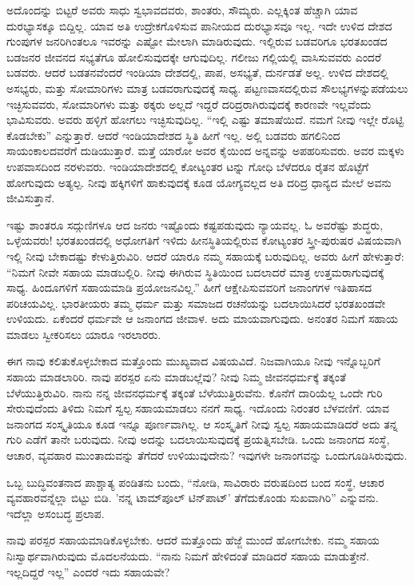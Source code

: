ಅದೊಂದನ್ನು ಬಿಟ್ಟರೆ ಅವರು ಸಾಧು ಸ್ವಭಾವದವರು, ಶಾಂತರು, ಸೌಮ್ಯರು. ಎಲ್ಲಕ್ಕಿಂತ ಹೆಚ್ಚಾಗಿ ಯಾವ ದುರಭ್ಯಾಸಕ್ಕೂ ಬಿದ್ದಿಲ್ಲ. ಯಾವ ಅತಿ ಉದ್ರೇಕಗೊಳಿಸುವ ಪಾನೀಯದ ದುರಭ್ಯಾಸವೂ ಇಲ್ಲ. ಇದೇ ಉಳಿದ ದೇಶದ ಗುಂಪುಗಳ ಜನರಿಗಿಂತಲೂ ಇವರನ್ನು ಎಷ್ಟೋ ಮೇಲಾಗಿ ಮಾಡಿರುವುದು. ಇಲ್ಲಿರುವ ಬಡವರಿಗೂ ಭರತಖಂಡದ ಬಡಜನರ ಜೀವನದ ಸಭ್ಯತೆಗೂ ಹೋಲಿಸುವುದಕ್ಕೇ ಆಗುವುದಿಲ್ಲ. ಗಲೀಜು ಗಲ್ಲಿಯಲ್ಲಿ ವಾಸಿಸುವವರು ಎಂದರೆ ಬಡವರು. ಆದರೆ ಬಡತನವೆಂದರೆ ಇಂಡಿಯಾ ದೇಶದಲ್ಲಿ, ಪಾಪ, ಅಸಭ್ಯತೆ, ದುರ್ನಡತೆ ಅಲ್ಲ. ಉಳಿದ ದೇಶದಲ್ಲಿ ಅಸಭ್ಯರು, ಮತ್ತು ಸೋಮಾರಿಗಳು ಮಾತ್ರ ಬಡವರಾಗುವುದಕ್ಕೆ ಸಾಧ್ಯ. ಪಟ್ಟಣವಾಸದಲ್ಲಿರುವ ಸೌಲಭ್ಯಗಳನ್ನು\break ಪಡೆಯಲು ಇಚ್ಛಿಸುವವರು, ಸೋಮಾರಿಗಳು ಮತ್ತು ಠಕ್ಕರು ಅಲ್ಲದೆ ಇದ್ದರೆ ದರಿದ್ರರಾಗಿರುವುದಕ್ಕೆ ಕಾರಣವೇ ಇಲ್ಲವೆಂದು ಭಾವಿಸುವರು. ಅವರು ಹಳ್ಳಿಗೆ ಹೋಗಲು ಇಚ್ಛಿಸುವುದಿಲ್ಲ. “ಇಲ್ಲಿ ಎಷ್ಟು ತಮಾಷೆಯಿದೆ. ನಮಗೆ ನೀವು ಇಲ್ಲೇ ರೊಟ್ಟಿ ಕೊಡಬೇಕು” ಎನ್ನುತ್ತಾರೆ. ಆದರೆ ಇಂಡಿಯಾದೇಶದ ಸ್ಥಿತಿ ಹೀಗೆ ಇಲ್ಲ. ಅಲ್ಲಿ ಬಡವರು ಹಗಲಿನಿಂದ ಸಾಯಂಕಾಲದವರೆಗೆ ದುಡಿಯುತ್ತಾರೆ. ಮತ್ತೆ ಯಾರೋ ಅವರ ಕೈಯಿಂದ ಅನ್ನವನ್ನು ಅಪಹರಿಸುವರು. ಅವರ ಮಕ್ಕಳು ಉಪವಾಸದಿಂದ ನರಳುವರು. ಇಂಡಿಯಾದೇಶದಲ್ಲಿ ಕೋಟ್ಯಂತರ ಟನ್ನು ಗೋಧಿ ಬೆಳೆದರೂ ರೈತನ ಹೊಟ್ಟೆಗೆ ಹೋಗುವುದು ಅತ್ಯಲ್ಪ. ನೀವು ಹಕ್ಕಿಗಳಿಗೆ ಹಾಕುವುದಕ್ಕೆ ಕೂಡ ಯೋಗ್ಯವಲ್ಲದ ಅತಿ ದರಿದ್ರ ಧಾನ್ಯದ ಮೇಲೆ ಅವನು ಜೀವಿಸುತ್ತಾನೆ.

ಇಷ್ಟು ಶಾಂತರೂ ಸದ್ಗುಣಿಗಳೂ ಆದ ಜನರು ಇಷ್ಟೊಂದು ಕಷ್ಟಪಡುವುದು ನ್ಯಾಯವಲ್ಲ. ಓ ಅವರೆಷ್ಟು ಶುದ್ಧರು, ಒಳ್ಳೆಯವರು! ಭರತಖಂಡದಲ್ಲಿ ಅಧೋಗತಿಗೆ ಇಳಿದು ಹೀನಸ್ಥಿತಿಯಲ್ಲಿರುವ ಕೋಟ್ಯಂತರ ಸ್ತ್ರೀ-ಪುರುಷರ ವಿಷಯವಾಗಿ ಇಲ್ಲಿ ನೀವು ಬೇಕಾದಷ್ಟು ಕೇಳುತ್ತಿರುವಿರಿ. ಆದರೆ ಯಾರೂ ನಮ್ಮ ಸಹಾಯಕ್ಕೆ ಬರುವುದಿಲ್ಲ. ಅವರು ಹೀಗೆ ಹೇಳುತ್ತಾರೆ: “ನಿಮಗೆ ನೀವೇ ಸಹಾಯ ಮಾಡಬಲ್ಲಿರಿ. ನೀವು ಈಗಿರುವ ಸ್ಥಿತಿಯಿಂದ ಬದಲಾದರೆ ಮಾತ್ರ ಉತ್ತಮರಾಗುವುದಕ್ಕೆ ಸಾಧ್ಯ. ಹಿಂದೂಗಳಿಗೆ ಸಹಾಯಮಾಡಿ ಪ್ರಯೋಜನವಿಲ್ಲ.” ಹೀಗೆ ಆಕ್ಷೇಪಿಸುವವರಿಗೆ ಜನಾಂಗಗಳ ಇತಿಹಾಸದ ಪರಿಚಯವಿಲ್ಲ. ಭಾರತೀಯರು ತಮ್ಮ ಧರ್ಮ ಮತ್ತು ಸಮಾಜದ ರಚನೆಯನ್ನು ಬದಲಾಯಿಸಿದರೆ ಭರತಖಂಡವೇ ಉಳಿಯದು. ಏಕೆಂದರೆ ಧರ್ಮವೇ ಆ ಜನಾಂಗದ ಜೀವಾಳ. ಅದು ಮಾಯವಾಗುವುದು. ಅನಂತರ ನಿಮಗೆ ಸಹಾಯ ಮಾಡಲು ಸ್ವೀಕರಿಸಲು ಯಾರೂ ಇರಲಾರರು.

ಈಗ ನಾವು ಕಲಿತುಕೊಳ್ಳಬೇಕಾದ ಮತ್ತೊಂದು ಮುಖ್ಯವಾದ ವಿಷಯವಿದೆ. ನಿಜವಾಗಿಯೂ ನೀವು ಇನ್ನೊಬ್ಬರಿಗೆ ಸಹಾಯ ಮಾಡಲಾರಿರಿ. ನಾವು ಪರಸ್ಪರ ಏನು ಮಾಡಬಲ್ಲೆವು? ನೀವು ನಿಮ್ಮ ಜೀವನಧರ್ಮಕ್ಕೆ ತಕ್ಕಂತೆ ಬೆಳೆಯುತ್ತಿರುವಿರಿ. ನಾನು ನನ್ನ ಜೀವನಧರ್ಮಕ್ಕೆ ತಕ್ಕಂತೆ ಬೆಳೆಯುತ್ತಿರುವೆನು. ಕೊನೆಗೆ ದಾರಿಯೆಲ್ಲ ಒಂದೇ ಗುರಿ ಸೇರುವುದೆಂದು ತಿಳಿದು ನಿಮಗೆ ಸ್ವಲ್ಪ ಸಹಾಯಮಾಡಲು ನನಗೆ ಸಾಧ್ಯ. ಇದೊಂದು ನಿರಂತರ ಬೆಳವಣಿಗೆ. ಯಾವ ಜನಾಂಗದ ಸಂಸ್ಕೃತಿಯೂ ಕೂಡ ಇನ್ನೂ ಪೂರ್ಣವಾಗಿಲ್ಲ. ಆ ಸಂಸ್ಕೃತಿಗೆ ನೀವು ಸ್ವಲ್ಪ ಸಹಾಯಮಾಡಿದರೆ ಅದು ತನ್ನ ಗುರಿ ಎಡೆಗೆ ತಾನೇ ಬರುವುದು. ನೀವು ಅದನ್ನು ಬದಲಾಯಿಸುವುದಕ್ಕೆ ಪ್ರಯತ್ನಿಸಬೇಡಿ. ಒಂದು ಜನಾಂಗದ ಸಂಸ್ಥೆ, ಆಚಾರ, ವ್ಯವಹಾರ ಮುಂತಾದುವನ್ನು ತೆಗೆದರೆ ಉಳಿಯುವುದೇನು? ಇವುಗಳೇ ಜನಾಂಗವನ್ನು ಒಂದುಗೂಡಿಸಿರುವುದು.

ಒಬ್ಬ ಬುದ್ಧಿವಂತನಾದ ಪಾಶ್ಚಾತ್ಯ ಪಂಡಿತನು ಬಂದು, “ನೋಡಿ, ಸಾವಿರಾರು ವರುಷದಿಂದ ಬಂದ ಸಂಸ್ಥೆ, ಆಚಾರ ವ್ಯವಹಾರವನ್ನೆಲ್ಲಾ ಬಿಟ್ಟು ಬಿಡಿ. 'ನನ್ನ ಟಾಮ್‌ಪೂಲ್ ಟಿನ್‌ಪಾಟ್' ತೆಗೆದುಕೊಂಡು ಸುಖವಾಗಿರಿ” ಎನ್ನುವನು. ಇದೆಲ್ಲಾ ಅಸಂಬದ್ಧ ಪ್ರಲಾಪ.

ನಾವು ಪರಸ್ಪರ ಸಹಾಯಮಾಡಿಕೊಳ್ಳಬೇಕು. ಆದರೆ ಮತ್ತೊಂದು ಹೆಜ್ಜೆ ಮುಂದೆ ಹೋಗಬೇಕು. ನಮ್ಮ ಸಹಾಯ ನಿಃಸ್ವಾರ್ಥವಾಗಿರುವುದು ಮೊದಲನೆಯದು. “ನಾನು ನಿಮಗೆ ಹೇಳಿದಂತೆ ಮಾಡಿದರೆ ಸಹಾಯ ಮಾಡುತ್ತೇನೆ. ಇಲ್ಲದಿದ್ದರೆ ಇಲ್ಲ” ಎಂದರೆ ಇದು ಸಹಾಯವೇ?

